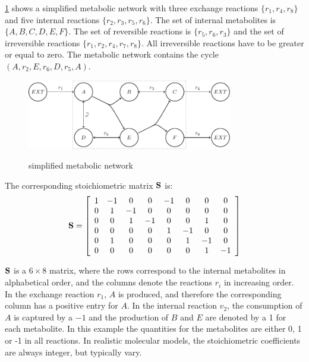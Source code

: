 \cref{fig:simple_model} shows a simplified metabolic network with three exchange reactions $\{r_1, r_4, r_8\}$ and five internal reactions $\{r_2, r_3, r_5, r_6\}$. The set of internal metabolites is $\{A, B, C, D, E, F\}$. The set of reversible reactions is $\{r_5, r_6, r_3\}$ and the set of irreversible reactions $\{r_1, r_2, r_4, r_7, r_8\}$. All irreversible reactions have to be greater or equal to zero. The metabolic network contains the cycle $(A, r_2, E, r_6, D, r_5, A)$.

\begin{figure}[h!]
    \centering
    \caption{simplified metabolic network}
    \includegraphics[width=0.8\textwidth]{Images/tikz_graphs_model_with_hyperarcs.pdf}
    \label{fig:simple_model}
\end{figure}


The corresponding stoichiometric matrix $\bold S$ is:
\begin{equation*}
    \bold S =
    \left[\begin{array}{cccccccc}
        1 & -1 & 0 & 0 & -1 & 0 & 0 & 0\\
        0 & 1 & -1 & 0 & 0 & 0 & 0 & 0\\
        0 & 0 & 1 & -1 & 0 & 0 & 1 & 0\\
        0 & 0 & 0 & 0 & 1 & -1 & 0 & 0\\
        0 & 1 & 0 & 0 & 0 & 1 & -1 & 0\\
        0 & 0 & 0 & 0 & 0 & 0 & 1 & -1\\    
    \end{array}\right]        
\end{equation*}

$\bold S$ is a $6 \times 8$ matrix, where the rows correspond to the internal metabolites in alphabetical order, and the columns denote the reactions $r_i$ in increasing order. In the exchange reaction $r_1$, $A$ is produced, and therefore the corresponding column has a positive entry for $A$. In the internal reaction $v_2$, the consumption of $A$ is captured by a $-1$ and the production of $B$ and $E$ are denoted by a 1 for each metabolite. In this example the quantities for the metabolites are either 0, 1 or -1 in all reactions. In realistic molecular models, the stoichiometric coefficients are always integer, but typically vary.

